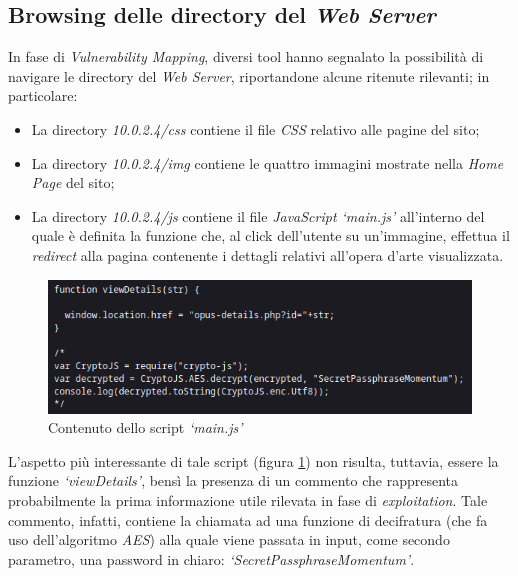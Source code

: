 \subsection{Browsing delle directory del \emph{Web Server}}
In fase di \emph{Vulnerability Mapping}, diversi tool hanno segnalato la possibilità di navigare le directory del \emph{Web Server}, riportandone alcune ritenute rilevanti; in particolare:
\begin{itemize}
    \item La directory \emph{10.0.2.4/css} contiene il file \emph{CSS} relativo alle pagine del sito;
    \item La directory \emph{10.0.2.4/img} contiene le quattro immagini mostrate nella \emph{Home Page} del sito;
    \item La directory \emph{10.0.2.4/js} contiene il file \emph{JavaScript `main.js'} all'interno del quale è definita la funzione che, al click dell'utente su un'immagine, effettua il \emph{redirect} alla pagina contenente i dettagli relativi all'opera d'arte visualizzata. 
    \end{itemize}
\begin{figure}[h]
    \centering
    \includegraphics[scale=1]{capitoli/images/js.png}
    \caption{Contenuto dello script \emph{`main.js'}}
    \label{fig:js}
\end{figure}
L'aspetto più interessante di tale script (figura \ref{fig:js}) non risulta, tuttavia, essere la funzione \emph{`viewDetails'}, bensì la presenza di un commento che rappresenta probabilmente la prima informazione utile rilevata in fase di \emph{exploitation}. Tale commento, infatti, contiene la chiamata ad una funzione di decifratura (che fa uso dell'algoritmo \emph{AES}) alla quale viene passata in input, come secondo parametro, una password in chiaro: \emph{`SecretPassphraseMomentum'}.
